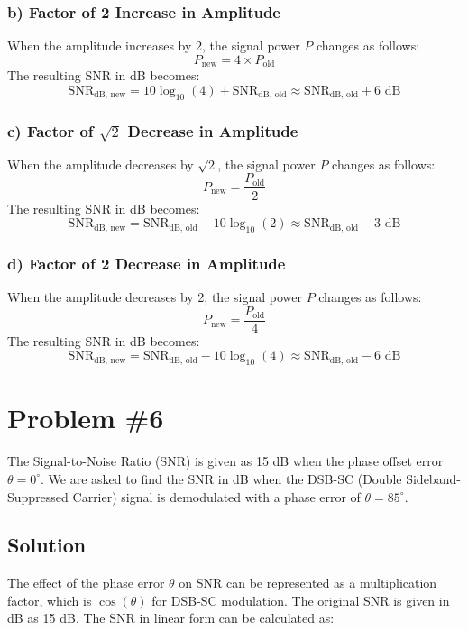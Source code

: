 \documentclass{article}
\begin{document}
\subsubsection*{b) Factor of 2 Increase in Amplitude}

When the amplitude increases by 2, the signal power \(P\) changes as follows:
\[
P_{\text{new}} = 4 \times P_{\text{old}}
\]
The resulting SNR in dB becomes:
\[
\text{SNR}_{\text{dB, new}} = 10 \log_{10} (4) + \text{SNR}_{\text{dB, old}} \approx \text{SNR}_{\text{dB, old}} + 6 \text{ dB}
\]

\subsubsection*{c) Factor of \( \sqrt{2} \) Decrease in Amplitude}

When the amplitude decreases by \( \sqrt{2} \), the signal power \(P\) changes as follows:
\[
P_{\text{new}} = \frac{P_{\text{old}}}{2}
\]
The resulting SNR in dB becomes:
\[
\text{SNR}_{\text{dB, new}} = \text{SNR}_{\text{dB, old}} - 10 \log_{10} (2) \approx \text{SNR}_{\text{dB, old}} - 3 \text{ dB}
\]

\subsubsection*{d) Factor of 2 Decrease in Amplitude}

When the amplitude decreases by 2, the signal power \(P\) changes as follows:
\[
P_{\text{new}} = \frac{P_{\text{old}}}{4}
\]
The resulting SNR in dB becomes:
\[
\text{SNR}_{\text{dB, new}} = \text{SNR}_{\text{dB, old}} - 10 \log_{10} (4) \approx \text{SNR}_{\text{dB, old}} - 6 \text{ dB}
\]

\newpage
\section*{Problem \#6}

The Signal-to-Noise Ratio (SNR) is given as 15 dB when the phase offset error \(\theta = 0^\circ\). We are asked to find the SNR in dB when the DSB-SC (Double Sideband-Suppressed Carrier) signal is demodulated with a phase error of \(\theta = 85^\circ\).

\subsection*{Solution}

The effect of the phase error \(\theta\) on SNR can be represented as a multiplication factor, which is \(\cos(\theta)\) for DSB-SC modulation. The original SNR is given in dB as 15 dB. The SNR in linear form can be calculated as:
\end{document}

